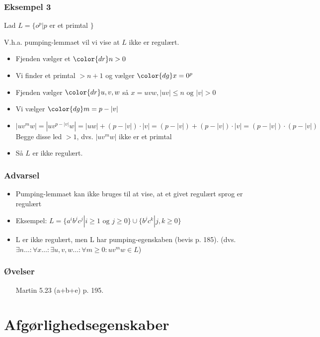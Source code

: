 \documentclass{beamer}
\begin{document}
\begin{frame}
\frametitle{Eksempel 3}
Lad $L = \{o^p | p $ er et primtal $ \}$

V.h.a. pumping-lemmaet vil vi vise at $L$ ikke er regulært.

\begin{itemize}[<+->]
\item Fjenden vælger et ${\color{dr}n}> 0$
\item Vi finder et primtal $>n+1$ og vælger ${\color{dg}x=0^p}$
\item Fjenden vælger ${\color{dr}u,v,w}$ så $x=uvw, |uv|\leq n \text{ og } |v| > 0$
\item Vi vælger ${\color{dg}m=p-|v|}$
\item $|uv^mw| = |uv^{p-|v|}w|=|uw|+(p-|v|)\cdot |v| = (p-|v|) + (p-|v|)\cdot |v|
  =(p-|v|)\cdot(p-|v|)$ Begge disse led $>1$, dvs. $|uv^mw|$ ikke er et primtal
\item Så $L$ er \alert{ikke} regulært.
\end{itemize}
\end{frame}

\begin{frame}
\frametitle{Advarsel}
\begin{itemize}[<+->]
\item  Pumping-lemmaet kan \alert{ikke} bruges til at vise, at  
et givet regulært sprog er regulært 
\item Eksempel: 
 $L = \{ a^ib^jc^j | i\geq 1\text{ og }j\geq 0 \} \cup \{ b^jc^k | j,k\geq 0 \}$
\item L er ikke regulært, men L har pumping-egenskaben (bevis p. 185).
(dvs. $\exists n\ldots:  \forall x\ldots:  \exists u,v,w\ldots:  \forall m\geq 0: uv^mw \in L$)
\end{itemize}
\end{frame}
\begin{frame}
\frametitle{Øvelser}
\begin{itemize}
\item [Martin] 5.23 (a+b+e) p. 195.
\end{itemize}
\end{frame}
\section{Afgørlighedsegenskaber}
\end{document}
